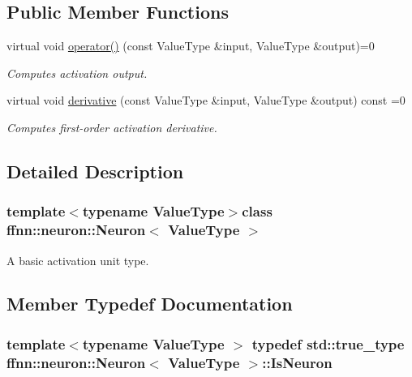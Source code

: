 \subsection*{Public Member Functions}
\begin{DoxyCompactItemize}
\item 
virtual void \hyperlink{classffnn_1_1neuron_1_1_neuron_ae215373ce29e135cb5fd728964772a32}{operator()} (const Value\-Type \&input, Value\-Type \&output)=0
\begin{DoxyCompactList}\small\item\em Computes activation output. \end{DoxyCompactList}\item 
virtual void \hyperlink{classffnn_1_1neuron_1_1_neuron_ac779b179887e6b4505dec96d0319af10}{derivative} (const Value\-Type \&input, Value\-Type \&output) const =0
\begin{DoxyCompactList}\small\item\em Computes first-\/order activation derivative. \end{DoxyCompactList}\end{DoxyCompactItemize}


\subsection{Detailed Description}
\subsubsection*{template$<$typename Value\-Type$>$class ffnn\-::neuron\-::\-Neuron$<$ Value\-Type $>$}

A basic activation unit type. 

\subsection{Member Typedef Documentation}
\hypertarget{classffnn_1_1neuron_1_1_neuron_a75bfde562dcb9d0e606f52ca73451de8}{
\subsubsection[{Is\-Neuron}]{\setlength{\rightskip}{0pt plus 5cm}template$<$typename Value\-Type $>$ typedef std\-::true\-\_\-type {\bf ffnn\-::neuron\-::\-Neuron}$<$ Value\-Type $>$\-::{\bf Is\-Neuron}}}\label{classffnn_1_1neuron_1_1_neuron_a75bfde562dcb9d0e606f52ca73451de8}


